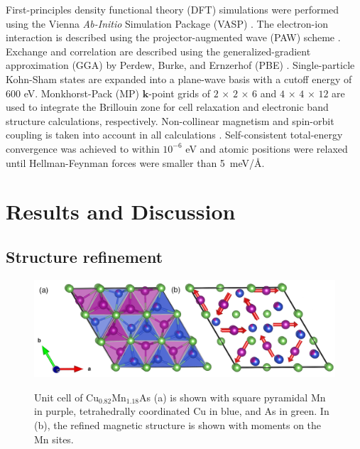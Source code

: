 \documentclass[10pt,doublespacing,edeposit]{uiucthesis2020}
\begin{document}
\begin{mainmatter}
First-principles density functional theory (DFT) simulations were performed using the Vienna \emph{Ab-Initio} Simulation Package  (VASP) \cite{Kresse:1996,Kresse:1999}. The electron-ion interaction is described using the projector-augmented wave (PAW) scheme \cite{Blochl:1994}. Exchange and correlation are described using the generalized-gradient approximation (GGA) by Perdew, Burke, and Ernzerhof  (PBE) \cite{Perdew:1997}. Single-particle Kohn-Sham states are expanded into a plane-wave basis with a cutoff energy of 600 eV. Monkhorst-Pack \cite{Monkhorst:1976} (MP) $\mathbf{k}$-point grids of $2\,\times\,2\,\times\,6$ and $4\,\times\,4\,\times\,12$ are used to integrate the Brillouin zone for cell relaxation and electronic band structure calculations, respectively.
Non-collinear magnetism and spin-orbit coupling is taken into account in all calculations \cite{Steiner2016}.
Self-consistent total-energy convergence was achieved to within $10^{-6}$ eV and atomic positions were relaxed until Hellman-Feynman forces were smaller than 5~meV/\AA.

\section{Results and Discussion}

\subsection{Structure refinement}

\begin{figure}
\centering\includegraphics[width=\columnwidth]{figures/ch5/h-cumnas_1x1_cells_v2.png} \\
\caption{\label{fig:unitcell}
Unit cell of Cu$_{0.82}$Mn$_{1.18}$As (a) is shown with square pyramidal Mn in purple, tetrahedrally coordinated Cu in blue, and As in green.
In (b), the refined magnetic structure is shown with moments on the Mn sites.
} 
\end{figure}


\end{mainmatter}
\end{document}
